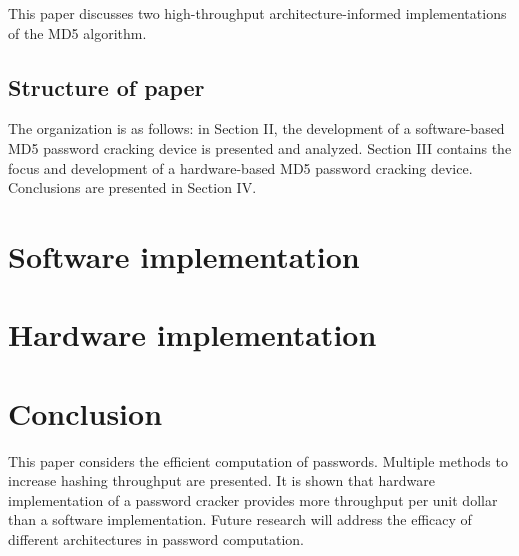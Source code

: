 	This paper discusses two high-throughput architecture-informed implementations of the MD5 algorithm. 



\subsection{Structure of paper}
	The organization is as follows: in Section II, the development of a software-based MD5 password cracking device is presented and analyzed. Section III contains the focus and development of a hardware-based MD5 password cracking device. Conclusions are presented in Section IV. 

\section{Software implementation}


\section{Hardware implementation}

%



\section{Conclusion}
	This paper considers the efficient computation of passwords. Multiple methods to increase hashing throughput are presented. It is shown that hardware implementation of a password cracker provides more throughput per unit dollar than a software implementation. Future research will address the efficacy of different architectures in password computation. 





